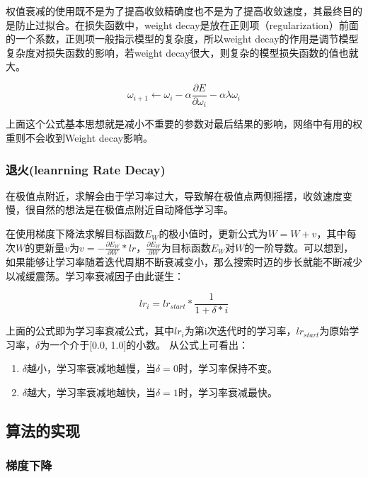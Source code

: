 \documentclass{ML}
\begin{document}
权值衰减的使用既不是为了提高收敛精确度也不是为了提高收敛速度，其最终目的是防止过拟合。在损失函数中，weight decay是放在正则项（regularization）前面的一个系数，正则项一般指示模型的复杂度，所以weight decay的作用是调节模型复杂度对损失函数的影响，若weight decay很大，则复杂的模型损失函数的值也就大。

$$\omega_{i+1}\leftarrow  \omega_{i} - \alpha \frac{\partial E}{\partial \omega_{i}} - \alpha \lambda \omega _{i}$$

上面这个公式基本思想就是减小不重要的参数对最后结果的影响，网络中有用的权重则不会收到Weight decay影响。

\subsubsection{退火(leanrning Rate Decay)}

在极值点附近，求解会由于学习率过大，导致解在极值点两侧摇摆，收敛速度变慢，很自然的想法是在极值点附近自动降低学习率。

在使用梯度下降法求解目标函数$E_{W}$的极小值时，更新公式为$W=W+ v$，其中每次$W$的更新量$v$为$v = - \frac{∂E_{W}}{∂W} * lr$，$\frac{∂E_{W}}{∂W}$为目标函数$E_{W}$对$W$的一阶导数。可以想到，如果能够让学习率随着迭代周期不断衰减变小，那么搜索时迈的步长就能不断减少以减缓震荡。学习率衰减因子由此诞生：


$$lr_i = lr_{start} * \frac{1}{1 + δ * i}$$

上面的公式即为学习率衰减公式，其中$lr_i$为第i次迭代时的学习率，$lr_{start}$为原始学习率，$δ$为一个介于[0.0, 1.0]的小数。
从公式上可看出：

\begin{enumerate}
	\item $δ$越小，学习率衰减地越慢，当$δ = 0$时，学习率保持不变。
	\item $δ$越大，学习率衰减地越快，当$δ = 1$时，学习率衰减最快。
\end{enumerate}

\subsection{算法的实现}

\subsubsection{梯度下降}
\end{document}
